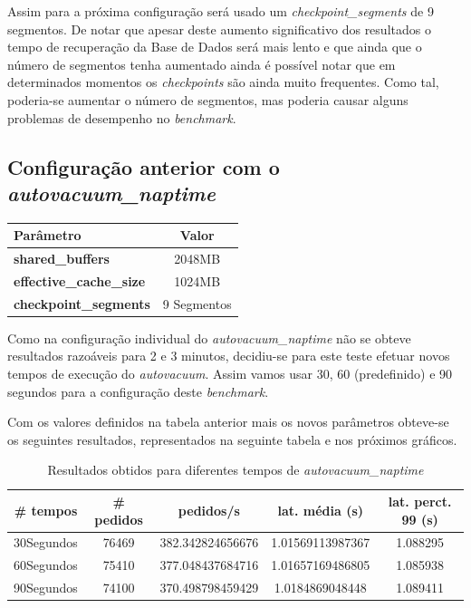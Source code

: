 Assim para a próxima configuração será usado um \textit{checkpoint\_segments} de 9 segmentos. De notar que apesar deste aumento significativo dos resultados o tempo de recuperação da Base de Dados será mais lento e que ainda que o número de segmentos tenha aumentado ainda é possível notar que em determinados momentos os \textit{checkpoints} são ainda muito frequentes. Como tal, poderia-se aumentar o número de segmentos, mas poderia causar alguns problemas de desempenho no \textit{benchmark}.

\newpage

\subsection{Configuração anterior com o \textit{autovacuum\_naptime}}

\begin{table}[!h]
\center
\small
\begin{tabular}{|l|c|}
\hline
\textbf{Parâmetro} & \textbf{Valor} \\ \hline
\textbf{shared\_buffers} & 2048MB  \\ \hline
\textbf{effective\_cache\_size} & 1024MB  \\ \hline
\textbf{checkpoint\_segments} & 9 Segmentos \\ \hline
\end{tabular}
\end{table}

Como na configuração individual do \textit{autovacuum\_naptime} não se obteve resultados razoáveis para 2 e 3 minutos, decidiu-se para este teste efetuar novos tempos de execução do \textit{autovacuum}. Assim vamos usar 30, 60 (predefinido) e 90 segundos para a configuração deste \textit{benchmark}.

Com os valores definidos na tabela anterior mais os novos parâmetros obteve-se os seguintes resultados, representados na seguinte tabela e nos próximos gráficos.

\begin{table}[!h]
\center
\small
\begin{tabular}{|c|c|c|c|c|}
\hline
\textbf{\# tempos} & \textbf{\# pedidos} & \textbf{pedidos/s} & \textbf{lat. média (s)} & \textbf{lat. perct. 99 (s)}  \\ \hline
30Segundos & 76469 & 382.342824656676 & 1.01569113987367 & 1.088295  \\ \hline
60Segundos & 75410 & 377.048437684716 & 1.01657169486805 & 1.085938  \\ \hline
90Segundos & 74100 & 370.498798459429 & 1.0184869048448 & 1.089411  \\ \hline
\end{tabular}
\caption{Resultados obtidos para diferentes tempos de \textit{autovacuum\_naptime}}
\end{table}

